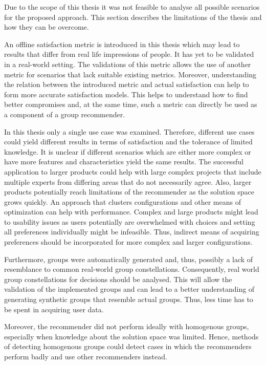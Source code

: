 Due to the scope of this thesis it was not feasible to analyse all possible scenarios for the proposed approach. This section describes the limitations of the thesis and how they can be overcome.

An offline satisfaction metric is introduced in this thesis which may lead to results that differ from real life impressions of people. It has yet to be validated in a real-world setting. The validations of this metric allows the use of another metric for scenarios that lack suitable existing metrics. Moreover, understanding the relation between the introduced metric and actual satisfaction can help to form more accurate satisfaction models. This helps to understand how to find better compromises and, at the same time, such a metric can directly be used as a component of a group recommender.

In this thesis only a single use case was examined. Therefore, different use cases could yield different results in terms of satisfaction and the tolerance of limited knowledge. It is unclear if different scenarios which are either more complex or have more features and characteristics yield the same results. The successful application to larger products could help with large complex projects that include multiple experts from differing areas that do not necessarily agree. Also, larger products potentially reach limitations of the recommender as the solution space grows quickly. An approach that clusters configurations and other means of optimization can help with performance. Complex and large products might lead to usability issues as users potentially are overwhelmed with choices and setting all preferences individually might be infeasible. Thus, indirect means of acquiring preferences should be incorporated for more complex and larger configurations. 

Furthermore, groups were automatically generated and, thus, possibly a lack of resemblance to common real-world group constellations. Consequently, real world group constellations for decisions should be analysed. This will allow the validation of the implemented groups and can lead to a better understanding of generating synthetic groups that resemble actual groups. Thus, less time has to be spent in acquiring user data.

Moreover, the recommender did not perform ideally with homogenous groups, especially when knowledge about the solution space was limited. Hence, methods of detecting homogenous groups could detect cases in which the recommenders perform badly and use other recommenders instead.

